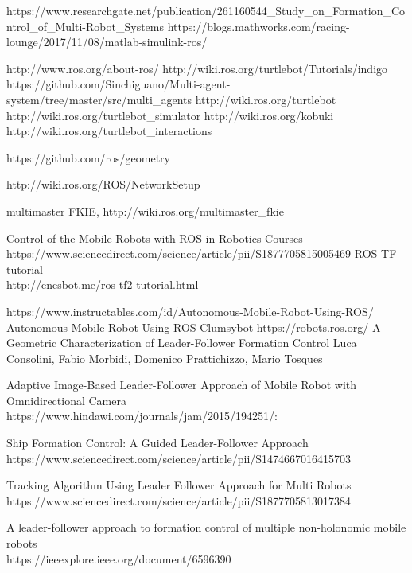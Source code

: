 \documentclass[journal]{IEEEtran}
\begin{document}

\begin{thebibliography}{1}

https://www.researchgate.net/publication/261160544{\_}Study{\_}on{\_}Formation{\_}Control{\_}of{\_}Multi-Robot{\_}Systems
https://blogs.mathworks.com/racing-lounge/2017/11/08/matlab-simulink-ros/

http://www.ros.org/about-ros/
http://wiki.ros.org/turtlebot/Tutorials/indigo
https://github.com/Sinchiguano/Multi-agent-system/tree/master/src/multi{\_}agents
http://wiki.ros.org/turtlebot
http://wiki.ros.org/turtlebot{\_}simulator
http://wiki.ros.org/kobuki
http://wiki.ros.org/turtlebot{\_}interactions

https://github.com/ros/geometry

http://wiki.ros.org/ROS/NetworkSetup


multimaster FKIE, http://wiki.ros.org/multimaster{\_}fkie




Control of the Mobile Robots with ROS in Robotics Courses\\
https://www.sciencedirect.com/science/article/pii/S1877705815005469
ROS TF tutorial\\
http://enesbot.me/ros-tf2-tutorial.html


https://www.instructables.com/id/Autonomous-Mobile-Robot-Using-ROS/\\
Autonomous Mobile Robot Using ROS Clumsybot
https://robots.ros.org/
A Geometric Characterization of Leader-Follower Formation Control
Luca Consolini, Fabio Morbidi, Domenico Prattichizzo, Mario Tosques





Adaptive Image-Based Leader-Follower Approach of Mobile Robot with Omnidirectional Camera\\ https://www.hindawi.com/journals/jam/2015/194251/:

Ship Formation Control: A Guided Leader-Follower Approach\\ https://www.sciencedirect.com/science/article/pii/S1474667016415703

Tracking Algorithm Using Leader Follower Approach for Multi Robots\\
https://www.sciencedirect.com/science/article/pii/S1877705813017384

A leader-follower approach to formation control of multiple non-holonomic mobile robots\\
https://ieeexplore.ieee.org/document/6596390






\end{thebibliography}
\end{document}
